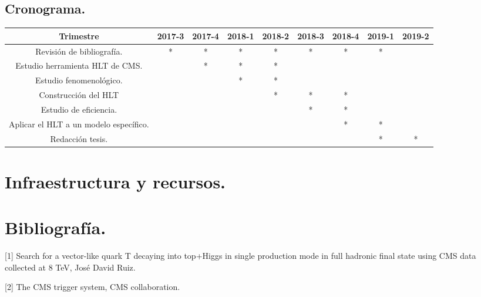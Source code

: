 \subsection{Cronograma.}

\begin{table}[h]
	\centering
	
	\label{my-label}
	\begin{tabular}{|c|c|c|c|c|c|c|c|c|}
		\hline
		Trimestre                              & 2017-3 & 2017-4 & 2018-1 & 2018-2 & 2018-3 & 2018-4 & 2019-1 & 2019-2 \\ \hline
		Revisión de bibliografía.              & *      & *      & *      & *      & *      & *      & *      &        \\ \hline
		Estudio herramienta HLT de CMS.        &        & *      & *      & *      &        &        &        &        \\ \hline
		Estudio fenomenológico.                &        &        & *      & *      &        &        &        &        \\ \hline
		Construcción del HLT                   &        &        &        & *      & *      & *      &        &        \\ \hline
		Estudio de eficiencia.                 &        &        &        &        & *      & *      &        &        \\ \hline
		Aplicar el HLT a un modelo específico. &        &        &        &        &        & *      & *      &        \\ \hline
		Redacción tesis.                       &        &        &        &        &        &        & *      & *      \\ \hline
	\end{tabular}
\end{table}
\section{Infraestructura y recursos.}

\section{Bibliografía.}

[1] Search for a vector-like quark T decaying into top+Higgs in single production mode in full hadronic final state using CMS data collected at 8 TeV, José David Ruiz.
\vspace{0.5cm}

[2] The CMS trigger system, CMS collaboration.

